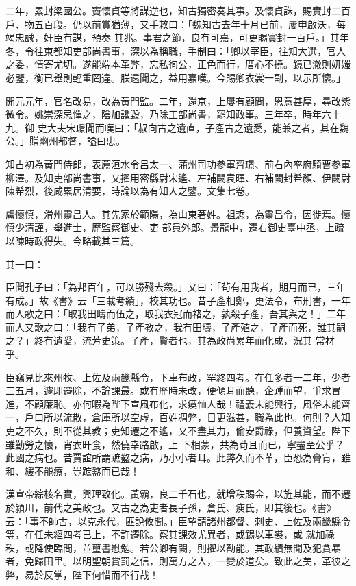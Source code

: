 \begin{pinyinscope}
 二年，累封梁國公。竇懷貞等將謀逆也，知古獨密奏其事。及懷貞誅，賜實封二百戶、物五百段。仍以前賞猶薄，又手敕曰：「魏知古去年十月已前，屢申啟沃，每竭忠誠，奸臣有謀，預奏
 其兆。事君之節，良有可嘉，可更賜實封一百戶。」其年冬，令往東都知吏部尚書事，深以為稱職，手制曰：「卿以宰臣，往知大選，官人之委，情寄尤切。遂能端本革弊，忘私徇公，正色而行，厝心不撓。鏡已澈則妍媸必鑒，衡已舉則輕重罔違。朕遠聞之，益用嘉嘆。今賜卿衣裳一副，以示所懷。」



 開元元年，官名改易，改為黃門監。二年，還京，上屢有顧問，恩意甚厚，尋改紫微令。姚崇深忌憚之，陰加讒毀，乃除工部尚書，罷知政事。三年卒，時年六十九。御
 史大夫宋璟聞而嘆曰：「叔向古之遺直，子產古之遺愛，能兼之者，其在魏公。」贈幽州都督，謚曰忠。



 知古初為黃門侍郎，表薦洹水令呂太一、蒲州司功參軍齊璟、前右內率府騎曹參軍柳澤。及知吏部尚書事，又擢用密縣尉宋遙、左補闕袁暉、右補闕封希顏、伊闕尉陳希烈，後咸累居清要，時論以為有知人之鑒。文集七卷。



 盧懷慎，滑州靈昌人。其先家於範陽，為山東著姓。祖悊，為靈昌令，因徙焉。懷慎少清謹，舉進士，歷監察御史、吏
 部員外郎。景龍中，遷右御史臺中丞，上疏以陳時政得失。今略載其三篇。



 其一曰：



 臣聞孔子曰：「為邦百年，可以勝殘去殺。」又曰：「茍有用我者，期月而已，三年有成。」故《書》云「三載考績」，校其功也。昔子產相鄭，更法令，布刑書，一年而人歌之曰：「取我田疇而伍之，取我衣冠而褚之，孰殺子產，吾其與之！」二年而人又歌之曰：「我有子弟，子產教之，我有田疇，子產殖之，子產而死，誰其嗣之？」終有遺愛，流芳史策。子產，賢者也，其為政尚累年而化成，況其
 常材乎。



 臣竊見比來州牧、上佐及兩畿縣令，下車布政，罕終四考。在任多者一二年，少者三五月，遽即遷除，不論課最。或有歷時未改，便傾耳而聽，企踵而望，爭求冒進，不顧廉恥。亦何暇為陛下宣風布化，求瘼恤人哉！禮義未能興行，風俗未能齊一，戶口所以流散，倉庫所以空虛，百姓凋弊，日更滋甚，職為此也。何則？人知吏之不久，則不從其教；吏知遷之不遙，又不盡其力，偷安爵祿，但養資望。陛下雖勤勞之懷，宵衣旰食，然僥幸路啟，上
 下相蒙，共為茍且而已，寧盡至公乎？此國之病也。昔賈誼所謂蹠盭之病，乃小小者耳。此弊久而不革，臣恐為膏肓，雖和、緩不能療，豈蹠盭而已哉！



 漢宣帝綜核名實，興理致化。黃霸，良二千石也，就增秩賜金，以旌其能，而不遷於潁川，前代之美政也。又古之為吏者長子孫，倉氏、瘐氏，即其後也。《書》云：「事不師古，以克永代，匪說攸聞。」臣望請諸州都督、刺史、上佐及兩畿縣令等，在任未經四考已上，不許遷除。察其課效尤異者，或錫以車裘，或
 就加祿秩，或降使臨問，並璽書慰勉。若公卿有闕，則擢以勸能。其政績無聞及犯貪暴者，免歸田里。以明聖朝賞罰之信，則萬方之人，一變於道矣。致此之美，革彼之弊，易於反掌，陛下何惜而不行哉！




\end{pinyinscope}
